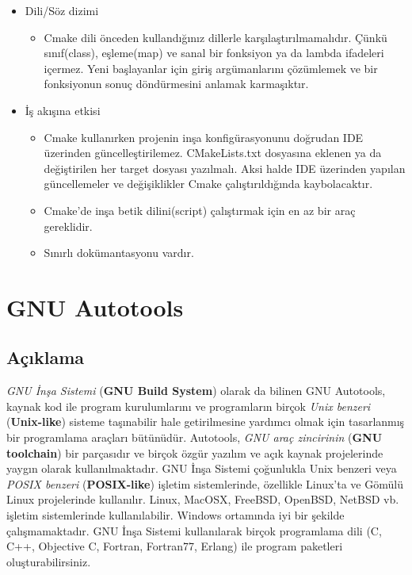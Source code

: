 \documentclass[
]{book}
\providecommand{\tightlist}{%
  \setlength{\itemsep}{0pt}\setlength{\parskip}{0pt}}
\begin{document}
\begin{itemize}
\tightlist
\item
  Dili/Söz dizimi

  \begin{itemize}
  \tightlist
  \item
    Cmake dili önceden kullandığınız dillerle karşılaştırılmamalıdır. Çünkü sınıf(class), eşleme(map) ve sanal bir fonksiyon ya da lambda ifadeleri içermez. Yeni başlayanlar için giriş argümanlarını çözümlemek ve bir fonksiyonun sonuç döndürmesini anlamak karmaşıktır.
  \end{itemize}
\item
  İş akışına etkisi

  \begin{itemize}
  \tightlist
  \item
    Cmake kullanırken projenin inşa konfigürasyonunu doğrudan IDE üzerinden güncelleştirilemez. CMakeLists.txt dosyasına eklenen ya da değiştirilen her target dosyası yazılmalı. Aksi halde IDE üzerinden yapılan güncellemeler ve değişiklikler Cmake çalıştırıldığında kaybolacaktır.
  \item
    Cmake'de inşa betik dilini(script) çalıştırmak için en az bir araç gereklidir.
  \item
    Sınırlı dokümantasyonu vardır.
  \end{itemize}
\end{itemize}

\hypertarget{gnu-autotools}{%
\chapter*{GNU Autotools}\label{gnu-autotools}}

\hypertarget{auxe7ux131klama-3}{%
\section*{Açıklama}\label{auxe7ux131klama-3}}

\emph{GNU İnşa Sistemi} (\textbf{GNU Build System}) olarak da bilinen GNU Autotools, kaynak kod ile program kurulumlarını ve programların birçok \emph{Unix benzeri} (\textbf{Unix-like}) sisteme taşınabilir hale getirilmesine yardımcı olmak için tasarlanmış bir programlama araçları bütünüdür. Autotools, \emph{GNU araç zincirinin} (\textbf{GNU toolchain}) bir parçasıdır ve birçok özgür yazılım ve açık kaynak projelerinde yaygın olarak kullanılmaktadır. GNU İnşa Sistemi çoğunlukla Unix benzeri veya \emph{POSIX benzeri} (\textbf{POSIX-like}) işletim sistemlerinde, özellikle Linux'ta ve Gömülü Linux projelerinde kullanılır. Linux, MacOSX, FreeBSD, OpenBSD, NetBSD vb. işletim sistemlerinde kullanılabilir. Windows ortamında iyi bir şekilde çalışmamaktadır. GNU İnşa Sistemi kullanılarak birçok programlama dili (C, C++, Objective C, Fortran, Fortran77, Erlang) ile program paketleri oluşturabilirsiniz.
\end{document}
